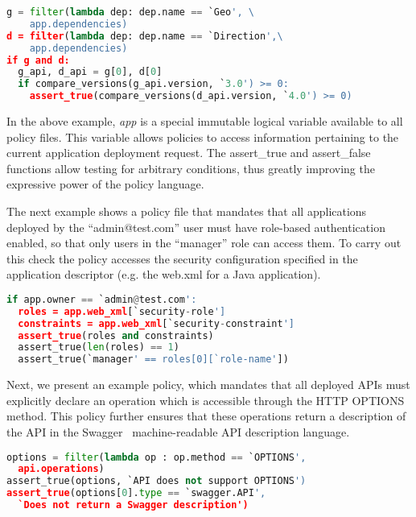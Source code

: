 \vspace{0.05in}
{\footnotesize
\begin{lstlisting}[language=Python, frame=single, showstringspaces=false]
g = filter(lambda dep: dep.name == `Geo', \
	app.dependencies)
d = filter(lambda dep: dep.name == `Direction',\
	app.dependencies)
if g and d:
  g_api, d_api = g[0], d[0]
  if compare_versions(g_api.version, `3.0') >= 0:
    assert_true(compare_versions(d_api.version, `4.0') >= 0)
\end{lstlisting}
}
\vspace{0.05in}

In the above example, \textit{app} is a special immutable logical variable available to
all policy files. This variable allows policies to access information
pertaining to the current application deployment request. The assert\_true and assert\_false
functions allow testing for arbitrary conditions, thus greatly improving the expressive
power of the policy language.

The next example shows a policy file that mandates that all applications deployed
by the ``admin@test.com'' user must have role-based authentication enabled, so that only
users in the ``manager'' role can access them. To carry out this check the policy accesses
the security configuration specified in the application descriptor (e.g. the
web.xml for a Java application).

\vspace{0.05in}
{\footnotesize
\begin{lstlisting}[language=Python, frame=single, showstringspaces=false]
if app.owner == `admin@test.com':
  roles = app.web_xml[`security-role']
  constraints = app.web_xml[`security-constraint']
  assert_true(roles and constraints)
  assert_true(len(roles) == 1)
  assert_true(`manager' == roles[0][`role-name'])
\end{lstlisting}
}
\vspace{0.05in}

Next, we present an example policy, which mandates that all deployed APIs must explicitly
declare an operation which is accessible through the HTTP OPTIONS method. This policy further ensures
that these operations return a description of the API in the Swagger~\cite{hl:swagger} machine-readable API
description language.

\vspace{0.05in}
{\footnotesize
\begin{lstlisting}[language=Python, frame=single, showstringspaces=false]
options = filter(lambda op : op.method == `OPTIONS',  
  api.operations)
assert_true(options, `API does not support OPTIONS')
assert_true(options[0].type == `swagger.API', 
  `Does not return a Swagger description')
\end{lstlisting}
}
\vspace{0.05in}

